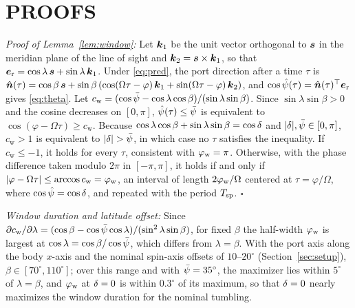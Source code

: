 \appendices

\section{PROOFS}\label{app:proofs}

\textit{Proof of Lemma~\ref{lem:window}:} Let $\boldsymbol{k}_{1}$ be the unit vector orthogonal to $\boldsymbol{s}$ in the meridian plane of the line of sight and $\boldsymbol{k}_{2}=\boldsymbol{s}\times\boldsymbol{k}_{1}$, so that $\boldsymbol{e}_{\mathrm{r}}=\cos\lambda\,\boldsymbol{s}+\sin\lambda\,\boldsymbol{k}_{1}$. Under \eqref{eq:pred}, the port direction after a time $\tau$ is $\hat{\boldsymbol{n}}(\tau)=\cos\beta\,\boldsymbol{s}+\sin\beta\,(\cos(\Omega\tau-\varphi)\,\boldsymbol{k}_{1}+\sin(\Omega\tau-\varphi)\,\boldsymbol{k}_{2})$, and $\cos\hat\psi(\tau)=\hat{\boldsymbol{n}}(\tau)^{\top}\boldsymbol{e}_{\mathrm{r}}$ gives \eqref{eq:theta}. Let $c_{\mathrm{w}}=(\cos\bar\psi-\cos\lambda\cos\beta)/(\sin\lambda\sin\beta)$. Since $\sin\lambda\sin\beta>0$ and the cosine decreases on $[0,\pi]$, $\hat\psi(\tau)\le\bar\psi$ is equivalent to $\cos(\varphi-\Omega\tau)\ge c_{\mathrm{w}}$. Because $\cos\lambda\cos\beta+\sin\lambda\sin\beta=\cos\delta$ and $|\delta|,\bar\psi\in[0,\pi]$, $c_{\mathrm{w}}>1$ is equivalent to $|\dlat|>\psig$, in which case no $\tau$ satisfies the inequality. If $c_{\mathrm{w}}\le-1$, it holds for every $\tau$, consistent with $\varphi_{\mathrm{w}}=\pi$. Otherwise, with the phase difference taken modulo $2\pi$ in $[-\pi,\pi]$, it holds if and only if $|\varphi-\Omega\tau|\le\arccos c_{\mathrm{w}}=\varphi_{\mathrm{w}}$, an interval of length $2\varphi_{\mathrm{w}}/\Omega$ centered at $\tau=\varphi/\Omega$, where $\cos\hat\psi=\cos\delta$, and repeated with the period $T_{\mathrm{sp}}$. \hfill$\square$

\textit{Window duration and latitude offset:} Since $\partial c_{\mathrm{w}}/\partial\lambda=(\cos\beta-\cos\bar\psi\cos\lambda)/(\sin^{2}\lambda\sin\beta)$, for fixed $\beta$ the half-width $\varphi_{\mathrm{w}}$ is largest at $\cos\lambda=\cos\beta/\cos\bar\psi$, which differs from $\lambda=\beta$. With the port axis along the body $x$-axis and the nominal spin-axis offsets of $10$--$20^{\circ}$ (Section~\ref{sec:setup}), $\beta\in[70^{\circ},110^{\circ}]$; over this range and with $\bar\psi=35^{\circ}$, the maximizer lies within $5^{\circ}$ of $\lambda=\beta$, and $\varphi_{\mathrm{w}}$ at $\delta=0$ is within $0.3^{\circ}$ of its maximum, so that $\delta=0$ nearly maximizes the window duration for the nominal tumbling.

